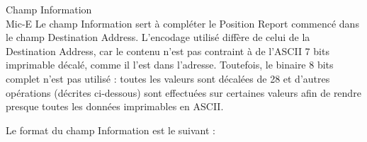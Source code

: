 \begin{aprssideblock}{Champ Information\\Mic-E}
Le champ Information sert à compléter le Position Report commencé dans le
champ Destination Address. L'encodage utilisé diffère de celui de la
Destination Address, car le contenu n'est pas contraint à de l'ASCII 7 bits
imprimable décalé, comme il l'est dans l'adresse. Toutefois, le binaire 8 bits
complet n'est pas utilisé : toutes les valeurs sont décalées de 28 et d'autres
opérations (décrites ci-dessous) sont effectuées sur certaines valeurs afin de
rendre presque toutes les données imprimables en ASCII.

Le format du champ Information est le suivant :
\end{aprssideblock}

\begin{center}
\footnotesize\sffamily\setlength{\tabcolsep}{1.5pt}\renewcommand{\arraystretch}{1.40}
\end{center}

